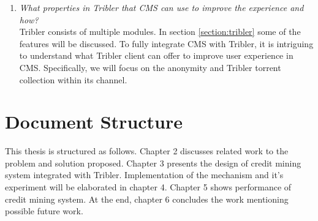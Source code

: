 \begin{enumerate}
	\item \textit{What properties in Tribler that CMS can use to improve the experience and how?}
		\\ Tribler consists of multiple modules. In section \ref{section:tribler} some of the features will be discussed. To fully integrate CMS with Tribler, it is intriguing to understand what Tribler client can offer to improve user experience in CMS. Specifically, we will focus on the anonymity and Tribler torrent collection within its channel.
\end{enumerate}

\section{Document Structure}
This thesis is structured as follows. Chapter 2 discusses related work to the problem and solution proposed. Chapter 3 presents the design of credit mining system integrated with Tribler. Implementation of the mechanism and it's experiment will be elaborated in chapter 4. Chapter 5 shows performance of credit mining system. At the end, chapter 6 concludes the work mentioning possible future work.


